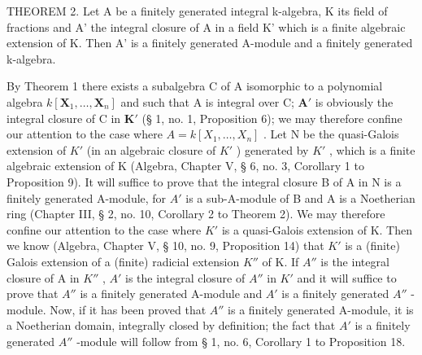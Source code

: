 THEOREM 2. Let A be a finitely generated integral k-algebra, K its field of fractions and A' the integral closure of A in a field K' which is a finite algebraic extension of K. Then A' is a finitely generated A-module and a finitely generated k-algebra.

By Theorem 1 there exists a subalgebra C of A isomorphic to a polynomial algebra \(k[\mathbf{X}_1, \ldots, \mathbf{X}_n]\) and such that A is integral over C; \(\mathbf{A}'\) is obviously the integral closure of C in \(\mathbf{K}'\) (§ 1, no. 1, Proposition 6); we may therefore confine our attention to the case where \(A = k[X_{1}, \ldots, X_{n}]\) . Let N be the quasi-Galois extension of \(K'\) (in an algebraic closure of \(K'\) ) generated by \(K'\) , which is a finite algebraic extension of K (Algebra, Chapter V, § 6, no. 3, Corollary 1 to Proposition 9). It will suffice to prove that the integral closure B of A in N is a finitely generated A-module, for \(A'\) is a sub-A-module of B and A is a Noetherian ring (Chapter III, § 2, no. 10, Corollary 2 to Theorem 2). We may therefore confine our attention to the case where \(K'\) is a quasi-Galois extension of K. Then we know (Algebra, Chapter V, § 10, no. 9, Proposition 14) that \(K'\) is a (finite) Galois extension of a (finite) radicial extension \(K''\) of K. If \(A''\) is the integral closure of A in \(K''\) , \(A'\) is the integral closure of \(A''\) in \(K'\) and it will suffice to prove that \(A''\) is a finitely generated A-module and \(A'\) is a finitely generated \(A''\) -module. Now, if it has been proved that \(A''\) is a finitely generated A-module, it is a Noetherian domain, integrally closed by definition; the fact that \(A'\) is a finitely generated \(A''\) -module will follow from § 1, no. 6, Corollary 1 to Proposition 18.

